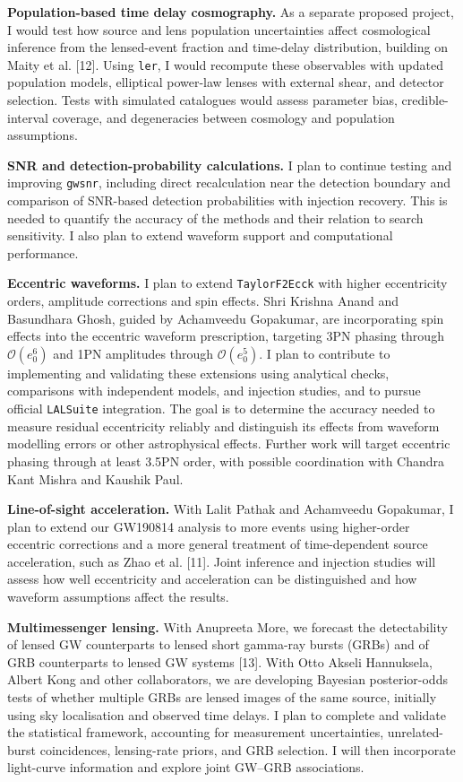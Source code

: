 \documentclass[11pt]{article}
\begin{document}
\textbf{Population-based time delay cosmography.} As a separate proposed project, I would test how source and lens population uncertainties affect cosmological inference from the lensed-event fraction and time-delay distribution, building on Maity et al. [12]. Using \texttt{ler}, I would recompute these observables with updated population models, elliptical power-law lenses with external shear, and detector selection. Tests with simulated catalogues would assess parameter bias, credible-interval coverage, and degeneracies between cosmology and population assumptions.

\textbf{SNR and detection-probability calculations.} I plan to continue testing and improving \texttt{gwsnr}, including direct recalculation near the detection boundary and comparison of SNR-based detection probabilities with injection recovery. This is needed to quantify the accuracy of the methods and their relation to search sensitivity. I also plan to extend waveform support and computational performance.

\newpage
\textbf{Eccentric waveforms.} I plan to extend \texttt{TaylorF2Ecck} with higher eccentricity orders, amplitude corrections and spin effects. Shri Krishna Anand and Basundhara Ghosh, guided by Achamveedu Gopakumar, are incorporating spin effects into the eccentric waveform prescription, targeting 3PN phasing through $\mathcal{O}(e_0^6)$ and 1PN amplitudes through $\mathcal{O}(e_0^5)$. I plan to contribute to implementing and validating these extensions using analytical checks, comparisons with independent models, and injection studies, and to pursue official \texttt{LALSuite} integration. The goal is to determine the accuracy needed to measure residual eccentricity reliably and distinguish its effects from waveform modelling errors or other astrophysical effects. Further work will target eccentric phasing through at least 3.5PN order, with possible coordination with Chandra Kant Mishra and Kaushik Paul.

\textbf{Line-of-sight acceleration.} With Lalit Pathak and Achamveedu Gopakumar, I plan to extend our GW190814 analysis to more events using higher-order eccentric corrections and a more general treatment of time-dependent source acceleration, such as Zhao et al. [11]. Joint inference and injection studies will assess how well eccentricity and acceleration can be distinguished and how waveform assumptions affect the results.

\textbf{Multimessenger lensing.} With Anupreeta More, we forecast the detectability of lensed GW counterparts to lensed short gamma-ray bursts (GRBs) and of GRB counterparts to lensed GW systems [13]. With Otto Akseli Hannuksela, Albert Kong and other collaborators, we are developing Bayesian posterior-odds tests of whether multiple GRBs are lensed images of the same source, initially using sky localisation and observed time delays. I plan to complete and validate the statistical framework, accounting for measurement uncertainties, unrelated-burst coincidences, lensing-rate priors, and GRB selection. I will then incorporate light-curve information and explore joint GW--GRB associations.
\end{document}
